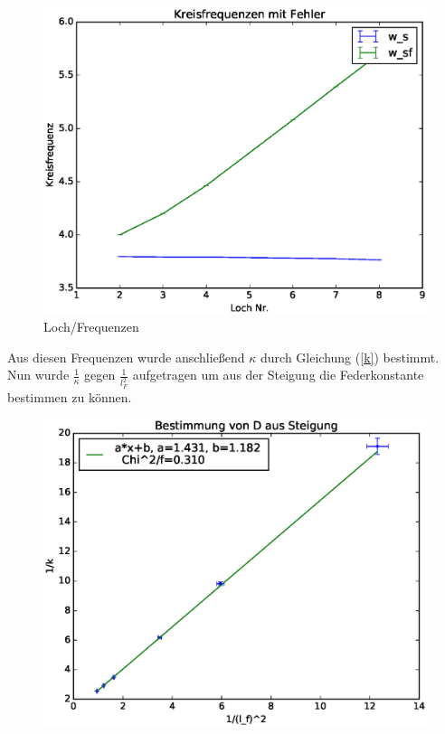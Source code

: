 \documentclass[12pt,a4paper]{article}
\begin{document}
\begin{figure}[H]
\centering
\includegraphics[scale=0.7]{Bilder/Kreisfrequenzen_fuer_Kappa.eps}
\caption{Loch/Frequenzen}
\end{figure}
Aus diesen Frequenzen wurde anschließend $\kappa$ durch Gleichung (\ref{k}) bestimmt.
\newline
Nun wurde $\frac{1}{\kappa}$ gegen $\frac{1}{l_F^2}$ aufgetragen um aus der Steigung die Federkonstante bestimmen zu können.
\begin{figure}[H]
\centering
\caption{}
\includegraphics[scale=0.7]{Bilder/Bestimmung_D_linreg.eps}
\end{figure}
\end{document}

